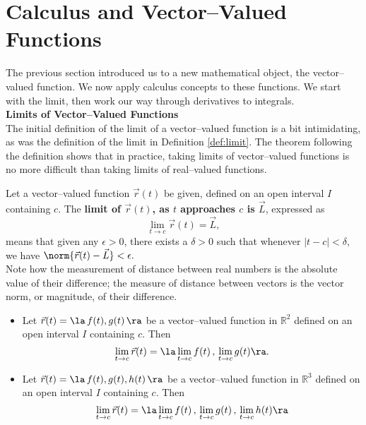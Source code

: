 \section{Calculus and Vector--Valued Functions}\label{sec:vvf_calc}

The previous section introduced us to a new mathematical object, the vector--valued function. We now apply calculus concepts to these functions. We start with the limit, then work our way through derivatives to integrals.\\

\noindent\textbf{\large Limits of Vector--Valued Functions}\\

The initial definition of the limit of a vector--valued function is a bit intimidating, as was the definition of the limit in Definition \ref{def:limit}. The theorem following the definition shows that in practice, taking limits of vector--valued functions is no more difficult than taking limits of real--valued functions.

{Let a vector--valued function $\vec r(t)$ be given, defined on an open interval $I$ containing $c$. The \textbf{limit of $\vec r(t)$, as $t$ approaches $c$ is $\vec L$}, expressed as 
$$\lim_{t\to c} \vec r(t) = \vec L,$$ means that given any $\epsilon>0$, there exists a $\delta>0$ such that whenever $|t-c| <\delta$, we have $\norm{\vec r(t) - \vec L} < \epsilon.$
}\\

Note how the measurement of distance between real numbers is the absolute value of their difference; the measure of distance between vectors is the vector norm, or magnitude, of their difference.
\enlargethispage{2\baselineskip}

{\begin{itemize}
	\item Let $\vec r(t) = \la \,f(t),g(t)\,\ra$ be a vector--valued function in $\mathbb{R}^2$ defined on an open interval $I$ containing $c$. Then 
	$$\lim_{t\to c} \vec r(t) = \la \lim_{t\to c}f(t)\, , \,\lim_{t\to c} g(t)\ra.$$
	\item Let $\vec r(t) = \la \,f(t),g(t),h(t)\,\ra$ be a vector--valued function in $\mathbb{R}^3$ defined on an open interval $I$ containing $c$. Then 
	$$\lim_{t\to c} \vec r(t) = \la \lim_{t\to c}f(t)\, , \,\lim_{t\to c} g(t)\,, \,\lim_{t\to c} h(t)\ra$$
\end{itemize}
}

